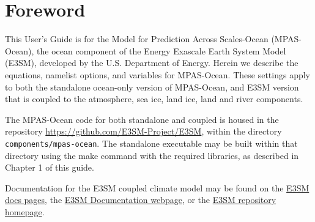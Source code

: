 \chapter*{Foreword}
\label{chap:foreword}

This User's Guide is for the Model for Prediction Across Scales-Ocean
(MPAS-Ocean), the ocean component of the Energy Exascale Earth System Model
(E3SM), developed by the U.S. Department of Energy. Herein we describe the
equations, namelist options, and variables for MPAS-Ocean. These settings apply
 to both the standalone ocean-only version of MPAS-Ocean, and E3SM version that
  is coupled to the atmosphere, sea ice, land ice, land and river components.

The MPAS-Ocean code for both standalone and coupled is housed in the repository
\url{https://github.com/E3SM-Project/E3SM}, within the directory
\texttt{components/mpas-ocean}. The standalone executable may be built within
that directory using the make command with the required libraries, as described
in Chapter 1 of this guide.

Documentation for the E3SM coupled climate model may be found on the
\href{https://docs.e3sm.org/E3SM/}{E3SM docs pages}, the
\href{https://acme-climate.atlassian.net/wiki/spaces/DOC/overview?homepageId=1931641291}{E3SM Documentation webpage},
or the \href{https://github.com/E3SM-Project/E3SM}{E3SM repository homepage}.
